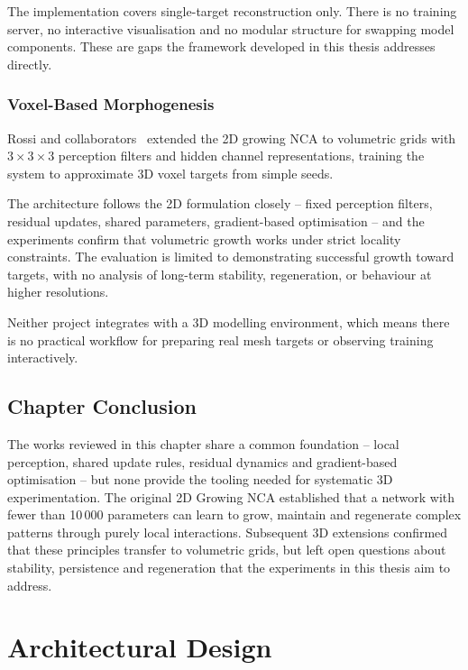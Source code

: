 The implementation covers single-target reconstruction only. There is no training
server, no interactive visualisation and no modular structure for swapping model
components. These are gaps the framework developed in this thesis addresses directly.

\subsection{Voxel-Based Morphogenesis}

Rossi and collaborators~\cite{Rossi2021} extended the 2D growing NCA to volumetric
grids with $3 \times 3 \times 3$ perception filters and hidden channel
representations, training the system to approximate 3D voxel targets from simple
seeds.

The architecture follows the 2D formulation closely -- fixed perception filters,
residual updates, shared parameters, gradient-based optimisation -- and the
experiments confirm that volumetric growth works under strict locality constraints.
The evaluation is limited to demonstrating successful growth toward targets, with no
analysis of long-term stability, regeneration, or behaviour at higher resolutions.

Neither project integrates with a 3D modelling environment, which means there is no
practical workflow for preparing real mesh targets or observing training interactively.

\section{Chapter Conclusion}

The works reviewed in this chapter share a common foundation -- local perception,
shared update rules, residual dynamics and gradient-based optimisation -- but none
provide the tooling needed for systematic 3D experimentation. The original 2D Growing
NCA established that a network with fewer than 10\,000 parameters can learn to grow,
maintain and regenerate complex patterns through purely local interactions.
Subsequent 3D extensions confirmed that these principles transfer to volumetric grids,
but left open questions about stability, persistence and regeneration that the
experiments in this thesis aim to address.

\chapter{Architectural Design}

